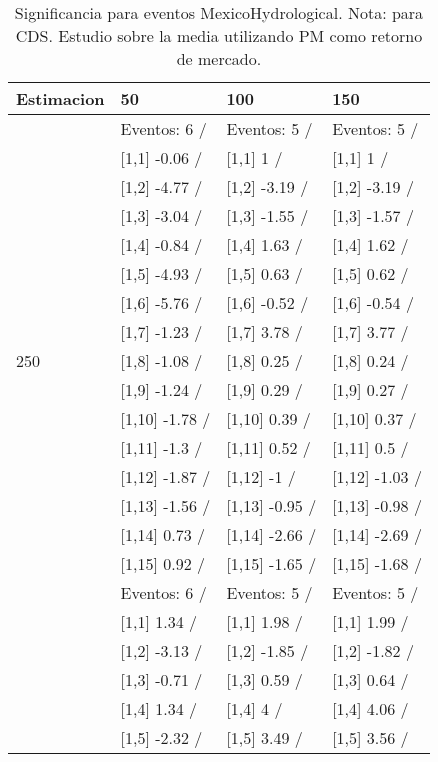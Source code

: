 \begin{table}

\caption{Significancia para eventos MexicoHydrological. Nota: para CDS. Estudio sobre la media utilizando PM como retorno de mercado.}
\centering
\begin{tabular}[t]{llll}
\toprule
Estimacion & 50 & 100 & 150\\
\midrule
 & Eventos:  6 / & Eventos:  5 / & Eventos:  5 /\\
 & {}[1,1] -0.06  / & {}[1,1] 1  / & {}[1,1] 1  /\\
 & {}[1,2] -4.77  / & {}[1,2] -3.19  / & {}[1,2] -3.19  /\\
 & {}[1,3] -3.04  / & {}[1,3] -1.55  / & {}[1,3] -1.57  /\\
 & {}[1,4] -0.84  / & {}[1,4] 1.63  / & {}[1,4] 1.62  /\\
\addlinespace
 & {}[1,5] -4.93  / & {}[1,5] 0.63  / & {}[1,5] 0.62  /\\
 & {}[1,6] -5.76  / & {}[1,6] -0.52  / & {}[1,6] -0.54  /\\
 & {}[1,7] -1.23  / & {}[1,7] 3.78  / & {}[1,7] 3.77  /\\
250 & {}[1,8] -1.08  / & {}[1,8] 0.25  / & {}[1,8] 0.24  /\\
 & {}[1,9] -1.24  / & {}[1,9] 0.29  / & {}[1,9] 0.27  /\\
\addlinespace
 & {}[1,10] -1.78  / & {}[1,10] 0.39  / & {}[1,10] 0.37  /\\
 & {}[1,11] -1.3  / & {}[1,11] 0.52  / & {}[1,11] 0.5  /\\
 & {}[1,12] -1.87  / & {}[1,12] -1  / & {}[1,12] -1.03  /\\
 & {}[1,13] -1.56  / & {}[1,13] -0.95  / & {}[1,13] -0.98  /\\
 & {}[1,14] 0.73  / & {}[1,14] -2.66  / & {}[1,14] -2.69  /\\
\addlinespace
 & {}[1,15] 0.92  / & {}[1,15] -1.65  / & {}[1,15] -1.68  /\\
 & Eventos:  6 / & Eventos:  5 / & Eventos:  5 /\\
 & {}[1,1] 1.34  / & {}[1,1] 1.98  / & {}[1,1] 1.99  /\\
 & {}[1,2] -3.13  / & {}[1,2] -1.85  / & {}[1,2] -1.82  /\\
 & {}[1,3] -0.71  / & {}[1,3] 0.59  / & {}[1,3] 0.64  /\\
\addlinespace
 & {}[1,4] 1.34  / & {}[1,4] 4  / & {}[1,4] 4.06  /\\
 & {}[1,5] -2.32  / & {}[1,5] 3.49  / & {}[1,5] 3.56  /\\

\end{tabular}
\end{table}
